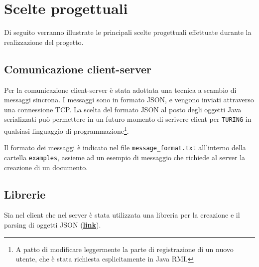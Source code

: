 \section{Scelte progettuali}
Di seguito verranno illustrate le principali scelte progettuali effettuate durante la realizzazione del progetto.





\subsection{Comunicazione client-server}
Per la comunicazione client-server è stata adottata una tecnica a scambio di messaggi sincrona. I messaggi sono in formato JSON, e vengono inviati attraverso una connessione TCP. La scelta del formato JSON al posto degli oggetti Java serializzati può permettere in un futuro momento di scrivere client per \texttt{TURING} in qualsiasi linguaggio di programmazione\footnote{A patto di modificare leggermente la parte di registrazione di un nuovo utente, che è stata richiesta esplicitamente in Java RMI.}.

\medskip

Il formato dei messaggi è indicato nel file \texttt{message\_format.txt} all'interno della cartella \texttt{examples}, assieme ad un esempio di messaggio che richiede al server la creazione di un documento.

\subsection{Librerie}
Sia nel client che nel server è stata utilizzata una libreria per la creazione e il parsing di oggetti JSON (\href{https://mvnrepository.com/artifact/org.json/json}{\textbf{link}}).
